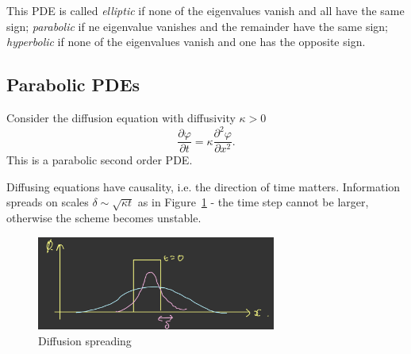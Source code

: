 \documentclass[11pt, a4paper]{article}
\renewcommand{\phi}{\varphi}
\theoremstyle{break}
\newcommand{\der}[2]{\frac{\partial #1}{\partial #2}}
\newcommand{\pder}[3][2]{\frac{\partial^#1 #2}{\partial #3^#1}}
\begin{document}
This PDE is called \emph{elliptic} if none of the eigenvalues vanish and all have the same sign; \emph{parabolic} if ne eigenvalue vanishes and the remainder have the same sign; \emph{hyperbolic} if none of the eigenvalues vanish and one has the opposite sign.

\subsection{Parabolic PDEs}

Consider the diffusion equation with diffusivity $\kappa>0$ \[\der\phi t=\kappa\pder\phi x.\] This is a parabolic second order PDE. 

Diffusing equations have causality, i.e. the direction of time matters. Information spreads on scales $\delta\sim\sqrt{\kappa t}$ as in Figure~\ref{fig:diffusionTopHat} - the time step cannot be larger, otherwise the scheme becomes unstable.

\begin{figure}
	\centering
	\includegraphics[width=0.7\textwidth]{diffusionSpreading}
	\caption{Diffusion spreading}
	\label{fig:diffusionTopHat}
\end{figure}
\end{document}
